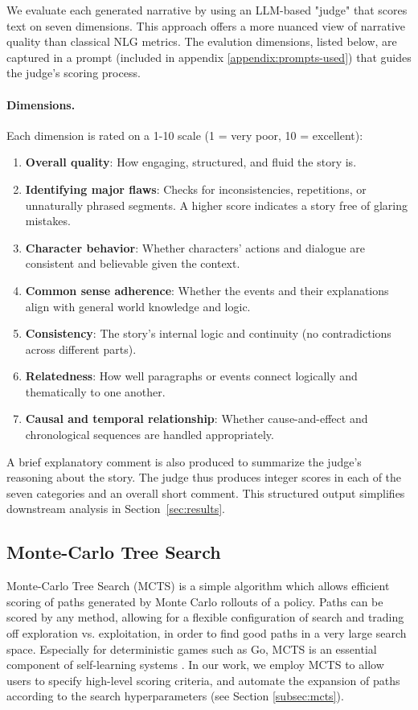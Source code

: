 \documentclass[11pt]{article}
\begin{document}
We evaluate each generated narrative by using an LLM-based "judge" that scores text on seven dimensions. This approach offers a more nuanced view of narrative quality than classical NLG metrics. The evalution dimensions, listed below, are captured in a prompt (included in appendix \ref{appendix:prompts-used}) that guides the judge's scoring process.

\paragraph{Dimensions.} Each dimension is rated on a 1-10 scale (1 = very poor, 10 = excellent):

\begin{enumerate}
    \item \textbf{Overall quality}: How engaging, structured, and fluid the story is.
    \item \textbf{Identifying major flaws}: Checks for inconsistencies, repetitions, or unnaturally phrased segments. A higher score indicates a story free of glaring mistakes.
    \item \textbf{Character behavior}: Whether characters' actions and dialogue are consistent and believable given the context.
    \item \textbf{Common sense adherence}: Whether the events and their explanations align with general world knowledge and logic.
    \item \textbf{Consistency}: The story's internal logic and continuity (no contradictions across different parts).
    \item \textbf{Relatedness}: How well paragraphs or events connect logically and thematically to one another.
    \item \textbf{Causal and temporal relationship}: Whether cause-and-effect and chronological sequences are handled appropriately.
\end{enumerate}

\noindent A brief explanatory comment is also produced to summarize the judge's reasoning about the story. The judge thus produces integer scores in each of the seven categories and an overall short comment. This structured output simplifies downstream analysis in Section~\ref{sec:results}.

\subsection{Monte-Carlo Tree Search}

Monte-Carlo Tree Search (MCTS) \citep{abramson-mcts-thesis,silver2016mastering} is a simple algorithm which allows efficient scoring of paths generated by Monte Carlo rollouts of a policy. Paths can be scored by any method, allowing for a flexible configuration of search and trading off exploration vs. exploitation, in order to find good paths in a very large search space. Especially for deterministic games such as Go, MCTS is an essential component of self-learning systems \citep{silver2016mastering}. In our work, we employ MCTS to allow users to specify high-level scoring criteria, and automate the expansion of paths according to the search hyperparameters (see Section \ref{subsec:mcts}).
\end{document}
